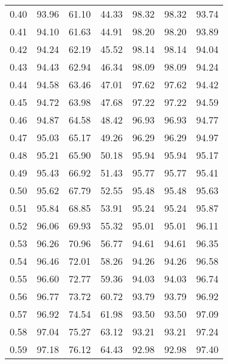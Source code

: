 \begin{tabular}{|c|c|c|c|c|c|c|}
      0.40 &     93.96 &     61.10 &      44.33 &   98.32 &      98.32 &         93.74 \\
      0.41 &     94.10 &     61.63 &      44.91 &   98.20 &      98.20 &         93.89 \\
      0.42 &     94.24 &     62.19 &      45.52 &   98.14 &      98.14 &         94.04 \\
      0.43 &     94.43 &     62.94 &      46.34 &   98.09 &      98.09 &         94.24 \\
      0.44 &     94.58 &     63.46 &      47.01 &   97.62 &      97.62 &         94.42 \\
      0.45 &     94.72 &     63.98 &      47.68 &   97.22 &      97.22 &         94.59 \\
      0.46 &     94.87 &     64.58 &      48.42 &   96.93 &      96.93 &         94.77 \\
      0.47 &     95.03 &     65.17 &      49.26 &   96.29 &      96.29 &         94.97 \\
      0.48 &     95.21 &     65.90 &      50.18 &   95.94 &      95.94 &         95.17 \\
      0.49 &     95.43 &     66.92 &      51.43 &   95.77 &      95.77 &         95.41 \\
      0.50 &     95.62 &     67.79 &      52.55 &   95.48 &      95.48 &         95.63 \\
      0.51 &     95.84 &     68.85 &      53.91 &   95.24 &      95.24 &         95.87 \\
      0.52 &     96.06 &     69.93 &      55.32 &   95.01 &      95.01 &         96.11 \\
      0.53 &     96.26 &     70.96 &      56.77 &   94.61 &      94.61 &         96.35 \\
      0.54 &     96.46 &     72.01 &      58.26 &   94.26 &      94.26 &         96.58 \\
      0.55 &     96.60 &     72.77 &      59.36 &   94.03 &      94.03 &         96.74 \\
      0.56 &     96.77 &     73.72 &      60.72 &   93.79 &      93.79 &         96.92 \\
      0.57 &     96.92 &     74.54 &      61.98 &   93.50 &      93.50 &         97.09 \\
      0.58 &     97.04 &     75.27 &      63.12 &   93.21 &      93.21 &         97.24 \\
      0.59 &     97.18 &     76.12 &      64.43 &   92.98 &      92.98 &         97.40 \\

\end{tabular}
